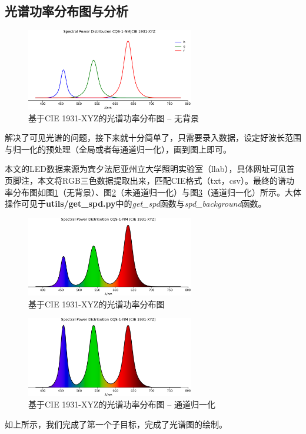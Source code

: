 \subsection{光谱功率分布图与分析}

\begin{figure}[htbp]
    \centering
    \includegraphics[width=0.65\textwidth]{"./imgs/sec2/CQS-1-NM-spd-rgb.pdf"}
    \caption{基于CIE 1931-XYZ的光谱功率分布图 -- 无背景}
    \label{fig:spd1931nobg}
\end{figure}

解决了可见光谱的问题，接下来就十分简单了，只需要录入数据，设定好波长范围与归一化的预处理（全局或者每通道归一化），画到图上即可。

本文的LED数据来源为宾夕法尼亚州立大学照明实验室（llab），具体网址可见首页脚注，本文将RGB三色数据提取出来，匹配CIE格式（txt，csv）。最终的谱功率分布图如图\ref{fig:spd1931nobg}（无背景）、图\ref{fig:spd1931bg}（未通道归一化）与图\ref{fig:spd1931bgn}（通道归一化）所示。大体操作可见于\textbf{utils/get\_spd.py}中的\textit{get\_spd}函数与\textit{spd\_background}函数。



\begin{figure}[htbp]
    \centering
    \includegraphics[width=0.65\textwidth]{"./imgs/sec2/CQS-1-NM-1931-spd.png"}
    \caption{基于CIE 1931-XYZ的光谱功率分布图}
    \label{fig:spd1931bg}
\end{figure}

\begin{figure}[htbp]
    \centering
    \includegraphics[width=0.65\textwidth]{"./imgs/sec2/CQS-1-NM-1931-spd-n.png"}
    \caption{基于CIE 1931-XYZ的光谱功率分布图 -- 通道归一化}
    \label{fig:spd1931bgn}
\end{figure}

如上所示，我们完成了第一个子目标，完成了光谱图的绘制。